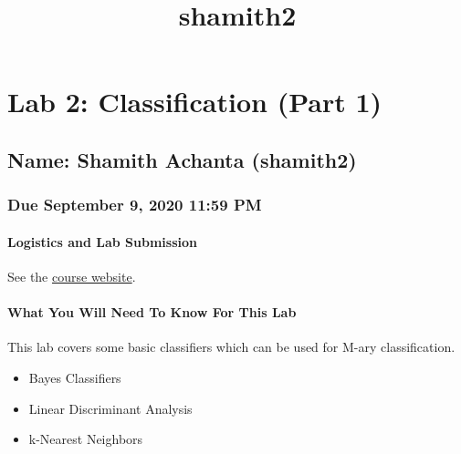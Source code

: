 \documentclass[11pt]{article}
\title{shamith2}
\providecommand{\tightlist}{%
      \setlength{\itemsep}{0pt}\setlength{\parskip}{0pt}}
\begin{document}
    
    \maketitle
    
    

    
    \hypertarget{lab-2-classification-part-1}{%
\section{Lab 2: Classification (Part
1)}\label{lab-2-classification-part-1}}

    \hypertarget{name-shamith-achanta-shamith2}{%
\subsection{Name: Shamith Achanta
(shamith2)}\label{name-shamith-achanta-shamith2}}

    \hypertarget{due-september-9-2020-1159-pm}{%
\subsubsection{Due September 9, 2020 11:59
PM}\label{due-september-9-2020-1159-pm}}

    \hypertarget{logistics-and-lab-submission}{%
\paragraph{Logistics and Lab
Submission}\label{logistics-and-lab-submission}}

    See the
\href{https://courses.engr.illinois.edu/ece365/fa2019/logisticsvvv.html}{course
website}.

    \hypertarget{what-you-will-need-to-know-for-this-lab}{%
\paragraph{What You Will Need To Know For This
Lab}\label{what-you-will-need-to-know-for-this-lab}}

    This lab covers some basic classifiers which can be used for M-ary
classification.

\begin{itemize}
\tightlist
\item
  Bayes Classifiers
\item
  Linear Discriminant Analysis
\item
  k-Nearest Neighbors
\end{itemize}
\end{document}
